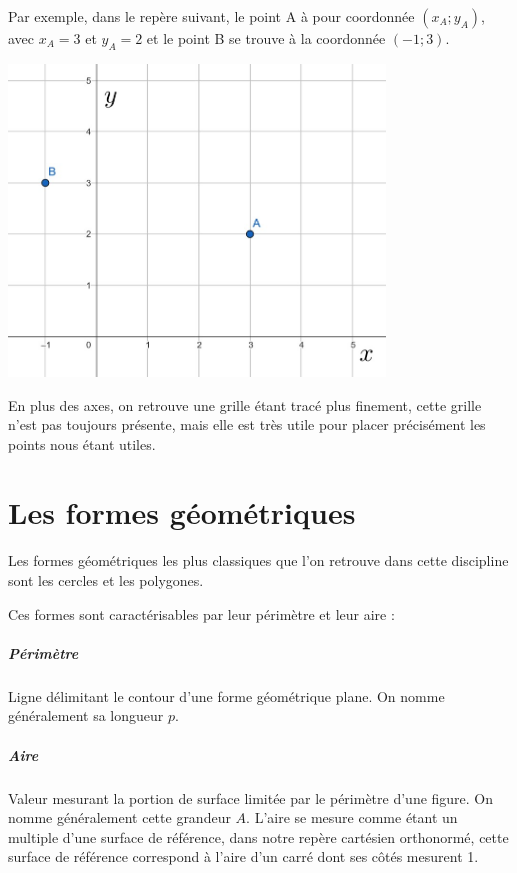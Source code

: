 \documentclass[a4paper, twoside]{article}
\begin{document}
\medbreak

Par exemple, dans le repère suivant, le point A à pour coordonnée $(x_A ; y_A)$,
avec $x_A = 3$ et $y_A = 2$ et le point B se trouve à la coordonnée $(-1 ; 3)$.

\begin{center}
	\includegraphics[width=10cm]{Image/repere_cartesien_orthonorme.jpg}
\end{center}

En plus des axes, on retrouve une grille étant tracé plus finement,
cette grille n'est pas toujours présente,
mais elle est très utile pour placer précisément les points nous étant utiles.

\newpage


\section{Les formes géométriques}

Les formes géométriques les plus classiques que l'on retrouve dans cette discipline
sont les cercles et les polygones.

\medbreak

Ces formes sont caractérisables par leur périmètre et leur aire :

\vspace{-0.2cm}

\subparagraph*{Périmètre} Ligne délimitant le contour d'une forme géométrique plane.
On nomme généralement sa longueur $p$.

\vspace{-0.2cm}

\subparagraph*{Aire} Valeur mesurant la portion de surface limitée par le périmètre d'une figure.
On nomme généralement cette grandeur $A$. L'aire se mesure comme étant un multiple d'une surface
de référence, dans notre repère cartésien orthonormé, cette surface de référence correspond à l'aire
d'un carré dont ses côtés mesurent 1.
\end{document}
